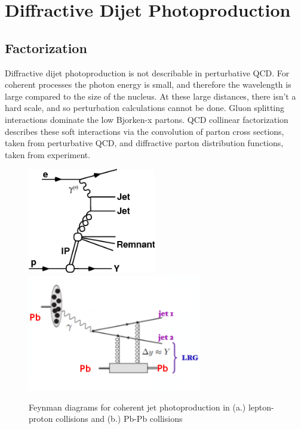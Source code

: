 
\chapter{Diffractive Dijet Photoproduction}

\section{Factorization}

Diffractive dijet photoproduction is not describable in perturbative QCD. For coherent processes the photon energy is small, and therefore the wavelength is large compared to the size of the nucleus. At these large distances, there isn't a hard scale, and so perturbation calculations cannot be done. Gluon splitting interactions dominate the low Bjorken-x partons. QCD collinear factorization describes these soft interactions via the convolution of parton cross sections, taken from perturbative QCD, and diffractive parton distribution functions, taken from experiment. 

\begin{figure}[h!]
\begin{centering}
\includegraphics[width=2.2in]{Chapter2/importfigs/fig1a.png}
\includegraphics[width=3in]{Chapter2/importfigs/fig3_daniel_upc.png}
\par\end{centering}
\caption{Feynman diagrams for coherent jet photoproduction in (a.) lepton-proton collisions and (b.) Pb-Pb collisions \label{fig:feynmanUPC1}}
\end{figure}

